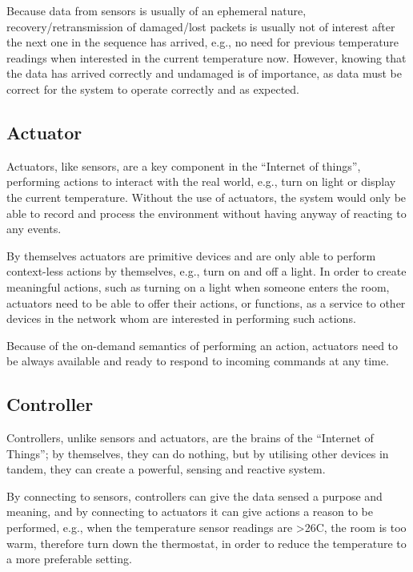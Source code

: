 Because data from sensors is usually of an ephemeral nature, recovery/retransmission of damaged/lost packets is usually not of interest after the next one in the sequence has arrived, e.g., no need for previous temperature readings when interested in the current temperature now. However, knowing that the data has arrived correctly and undamaged is of importance, as data must be correct for the system to operate correctly and as expected.

\subsection{Actuator} %
\label{sub:actuator}
Actuators, like sensors, are a key component in the ``Internet of things'', performing actions to interact with the real world, e.g., turn on light or display the current temperature. Without the use of actuators, the system would only be able to record and process the environment without having anyway of reacting to any events.

By themselves actuators are primitive devices and are only able to perform context-less actions by themselves, e.g., turn on and off a light. In order to create meaningful actions, such as turning on a light when someone enters the room, actuators need to be able to offer their actions, or functions, as a service to other devices in the network whom are interested in performing such actions.

Because of the on-demand semantics of performing an action, actuators need to be always available and ready to respond to incoming commands at any time. 

\subsection{Controller} %
\label{sub:controller}
Controllers, unlike sensors and actuators, are the brains of the ``Internet of Things''; by themselves, they can do nothing, but by utilising other devices in tandem, they can create a powerful, sensing and reactive system. 

By connecting to sensors, controllers can give the data sensed a purpose and meaning, and by connecting to actuators it can give actions a reason to be performed, e.g., when the temperature sensor readings are \textgreater 26C, the room is too warm, therefore turn down the thermostat, in order to reduce the temperature to a more preferable setting. 

